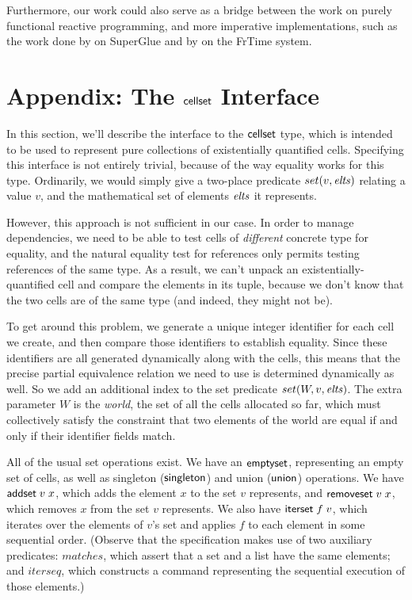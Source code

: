 Furthermore, our work could also serve as a bridge between the work on
purely functional reactive programming, and more imperative
implementations, such as the work done by \citet{superglue} on
SuperGlue and by \citet{frtime} on the FrTime system.


\section{Appendix: The $\mathsf{cellset}$ Interface}

In this section, we'll describe the interface to the $\mathsf{cellset}$ type,
which is intended to be used to represent pure collections of
existentially quantified cells. Specifying this interface is not
entirely trivial, because of the way equality works for this
type. Ordinarily, we would simply give a two-place predicate $set(v,
\mathit{elts})$ relating a value $v$, and the mathematical set of elements
$\mathit{elts}$ it represents.

However, this approach is not sufficient in our case. In order to
manage dependencies, we need to be able to test cells of
\emph{different} concrete type for equality, and the natural equality
test for references only permits testing references of the same
type. As a result, we can't unpack an existentially-quantified cell
and compare the elements in its tuple, because we don't know that the
two cells are of the same type (and indeed, they might not be).

To get around this problem, we generate a unique integer identifier
for each cell we create, and then compare those identifiers to
establish equality. Since these identifiers are all generated
dynamically along with the cells, this means that the precise partial
equivalence relation we need to use is determined dynamically as
well. So we add an additional index to the set predicate $set(W, v,
\mathit{elts})$. The extra parameter $W$ is the \emph{world}, the set of all
the cells allocated so far, which must collectively satisfy the
constraint that two elements of the world are equal if and only if their
identifier fields match.

All of the usual set operations exist. We have an $\mathsf{emptyset}$,
representing an empty set of cells, as well as singleton
($\mathsf{singleton}$) and union ($\mathsf{union}$) operations.  We have
$\mathsf{addset}\;v\;x$, which adds the element $x$ to the set $v$
represents, and $\mathsf{removeset}\;v\;x$, which removes $x$ from the
set $v$ represents. We also have $\mathsf{iterset}\;f\;v$, which
iterates over the elements of $v$'s set and applies $f$ to each
element in some sequential order. (Observe that the specification
makes use of two auxiliary predicates: $matches$, which assert that a
set and a list have the same elements; and $iterseq$, which constructs
a command representing the sequential execution of those elements.)

